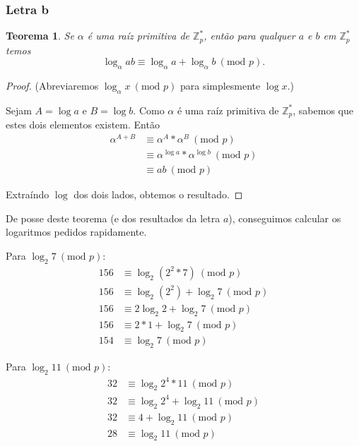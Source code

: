 \documentclass{article}
\newtheorem{theorem}{Teorema}
\renewcommand{\mod}[1]{ \ (\textrm{mod } #1) }
\begin{document}
\subsubsection{Letra b}

\begin{theorem}
    Se $\alpha$ é uma raíz primitiva de $\mathbb Z_p^*$,
    então para qualquer $a$ e $b$ em $\mathbb Z_p^*$ temos
    \begin{equation*}
        \log_\alpha ab \equiv \log_\alpha a + \log_\alpha b \mod{p}.
    \end{equation*}
\end{theorem}
\begin{proof}
    (Abreviaremos $\log_\alpha x \mod{p}$ para simplesmente $\log x$.)

    Sejam $A = \log a$ e $B = \log b$.
    Como $\alpha$ é uma raíz primitiva de $\mathbb Z_p^*$,
    sabemos que estes dois elementos existem.
    Então
    \begin{align*}
        \alpha^{A + B} &\equiv \alpha^A*\alpha^B \mod{p} \\
                       &\equiv \alpha^{\log a}*\alpha^{\log b} \mod{p} \\
                       &\equiv ab \mod{p}
    \end{align*}

    Extraíndo $\log$ dos dois lados, obtemos o resultado.
\end{proof}

De posse deste teorema (e dos resultados da letra $a$),
conseguimos calcular os logaritmos pedidos rapidamente.

Para $\log_2 7 \mod{p}$:
\begin{align*}
    156 &\equiv \log_2(2^2*7) \mod{p} \\
    156 &\equiv \log_2(2^2) + \log_2 7 \mod{p} \\
    156 &\equiv 2 \log_2 2 + \log_2 7 \mod{p} \\
    156 &\equiv 2 * 1 + \log_2 7 \mod{p} \\
    154 &\equiv \log_2 7 \mod{p}
\end{align*}

Para $\log_2 11 \mod{p}$:
\begin{align*}
    32 &\equiv \log_2 2^4*11 \mod{p} \\
    32 &\equiv \log_2 2^4 + \log_2 11 \mod{p} \\
    32 &\equiv 4 + \log_2 11 \mod{p} \\
    28 &\equiv \log_2 11 \mod{p}
\end{align*}
\end{document}
